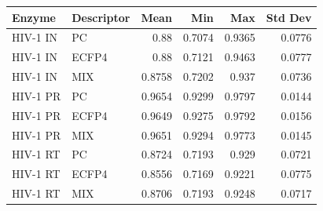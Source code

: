 \begin{tabular}{llrrrr}
\toprule
Enzyme & Descriptor & Mean & Min & Max & Std Dev \\
\midrule
HIV-1 IN & PC & 0.88 & 0.7074 & 0.9365 & 0.0776 \\
HIV-1 IN & ECFP4 & 0.88 & 0.7121 & 0.9463 & 0.0777 \\
HIV-1 IN & MIX & 0.8758 & 0.7202 & 0.937 & 0.0736 \\
HIV-1 PR & PC & 0.9654 & 0.9299 & 0.9797 & 0.0144 \\
HIV-1 PR & ECFP4 & 0.9649 & 0.9275 & 0.9792 & 0.0156 \\
HIV-1 PR & MIX & 0.9651 & 0.9294 & 0.9773 & 0.0145 \\
HIV-1 RT & PC & 0.8724 & 0.7193 & 0.929 & 0.0721 \\
HIV-1 RT & ECFP4 & 0.8556 & 0.7169 & 0.9221 & 0.0775 \\
HIV-1 RT & MIX & 0.8706 & 0.7193 & 0.9248 & 0.0717 \\
\bottomrule
\end{tabular}
